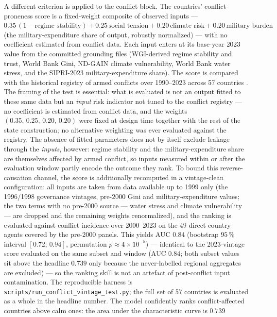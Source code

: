 \documentclass[a4paper,fleqn]{cas-sc}
\begin{document}
A different criterion is applied to the conflict block. The countries' conflict-proneness score
is a fixed-weight composite of observed inputs --- $0.35\,(1-\text{regime stability}) +
0.25\,\text{social tension} + 0.20\,\text{climate risk} + 0.20\,\text{military burden}$ (the
military-expenditure share of output, robustly normalized) --- with no coefficient estimated from
conflict data. Each input enters at its base-year 2023 value from the committed grounding files
(WGI-derived regime stability and trust, World Bank Gini, ND-GAIN climate vulnerability, World
Bank water stress, and the SIPRI-2023 military-expenditure share). The score is compared with the
historical registry of armed conflicts over 1990--2023 across 57 countries \citep{sundberg2013}. The framing of the test is essential: what is evaluated is not an output fitted to these
same data but an \emph{input} risk indicator not tuned to the conflict registry --- no
coefficient is estimated from conflict data, and the weights $(0.35,\,0.25,\,0.20,\,0.20)$
were fixed at design time together with the rest of the state construction; no alternative
weighting was ever evaluated against the registry. The absence of fitted parameters does not by
itself exclude leakage through the \emph{inputs}, however: regime stability and the
military-expenditure share are themselves affected by armed conflict, so inputs measured within
or after the evaluation window partly encode the outcome they rank. To bound this
reverse-causation channel, the score is additionally recomputed in a vintage-clean
configuration: all inputs are taken from data available up to 1999 only (the 1996/1998
governance vintages, pre-2000 Gini and military-expenditure values; the two terms with no
pre-2000 source --- water stress and climate vulnerability --- are dropped and the remaining
weights renormalized), and the ranking is evaluated against conflict incidence over 2000--2023
on the 49 direct country agents covered by the pre-2000 panels. This yields AUC $0.84$
(bootstrap $95\,\%$ interval $[0.72;\,0.94]$, permutation $p\approx4\times10^{-5}$) ---
identical to the 2023-vintage score evaluated on the same subset and window (AUC $0.84$; both
subset values sit above the headline $0.739$ only because the never-labelled regional
aggregates are excluded) --- so the ranking skill is not an artefact of post-conflict input
contamination. The reproducible harness is \texttt{scripts/run\_conflict\_vintage\_test.py};
the full set of 57 countries is evaluated as a whole in the headline number. The model confidently ranks
conflict-affected countries above calm ones: the area under the characteristic curve is $0.739$
\end{document}
